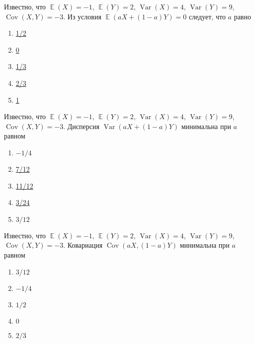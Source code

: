 \documentclass[t]{beamer}
\DeclareMathOperator{\Var}{Var}
\DeclareMathOperator{\Cov}{Cov}
\DeclareMathOperator{\E}{\mathbb{E}}
\begin{document}
 \begin{frame} \label{22} 
\begin{block}{22} 

Известно, что $\E(X)=-1$, $\E(Y)=2$, $\Var(X)=4$, $\Var(Y)=9$, $\Cov(X,Y)=-3$. Из условия  $\E(aX+(1-a)Y)=0$ следует, что $a$ равно


 \end{block} 
\begin{enumerate} 
\item[] \hyperlink{22-No}{\beamergotobutton{}  1/2 }
\item[] \hyperlink{22-No}{\beamergotobutton{}  0 }
\item[] \hyperlink{22-No}{\beamergotobutton{}  1/3 }
\item[] \hyperlink{22-Yes}{\beamergotobutton{}  2/3 }
\item[] \hyperlink{22-No}{\beamergotobutton{}  1 }
\end{enumerate} 
\end{frame} 


 \begin{frame} \label{23} 
\begin{block}{23} 

Известно, что $\E(X)=-1$, $\E(Y)=2$, $\Var(X)=4$, $\Var(Y)=9$, $\Cov(X,Y)=-3$. Дисперсия $\Var(aX+(1-a)Y)$ минимальна при $a$ равном


 \end{block} 
\begin{enumerate} 
\item[] \hyperlink{23-No}{\beamergotobutton{}  $-1/4$ }
\item[] \hyperlink{23-No}{\beamergotobutton{}  7/12 }
\item[] \hyperlink{23-Yes}{\beamergotobutton{}  11/12 }
\item[] \hyperlink{23-No}{\beamergotobutton{}  3/24 }
\item[] \hyperlink{23-No}{\beamergotobutton{}  $3/12$ }
\end{enumerate} 
\end{frame} 


 \begin{frame} \label{24} 
\begin{block}{24} 

Известно, что $\E(X)=-1$, $\E(Y)=2$, $\Var(X)=4$, $\Var(Y)=9$, $\Cov(X,Y)=-3$. Ковариация $\Cov(aX, (1-a)Y)$ минимальна при $a$ равном


 \end{block} 
\begin{enumerate} 
\item[] \hyperlink{24-No}{\beamergotobutton{}  $3/12$ }
\item[] \hyperlink{24-No}{\beamergotobutton{}  $-1/4$ }
\item[] \hyperlink{24-Yes}{\beamergotobutton{}  $1/2$ }
\item[] \hyperlink{24-No}{\beamergotobutton{}  $0$ }
\item[] \hyperlink{24-No}{\beamergotobutton{}  $2/3$ }
\end{enumerate} 
\end{frame} 
\end{document}

